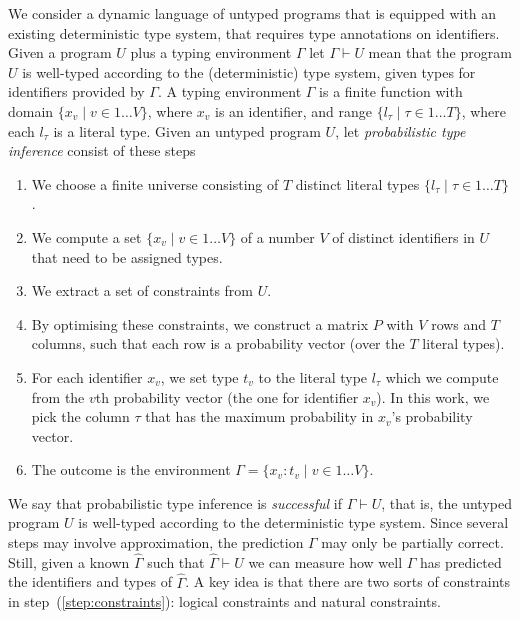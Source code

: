 \documentclass[acmsmall, review, anonymous]{acmart}\settopmatter{printfolios=true,printccs=false,printacmref=false}
\begin{document}
We consider a dynamic language of untyped programs that is equipped with an existing deterministic type system,
that requires type annotations on identifiers.
%
Given a program $U$ plus a typing environment $\Gamma$ let $\Gamma \vdash U$ mean that the program $U$ is well-typed according to the (deterministic) type system, given types for identifiers provided by $\Gamma$.
%
A typing environment $\Gamma$ is a finite function
with domain $\{ x_v \mid v \in 1 \ldots V\}$, where $x_v$  is an identifier, and range $\{ l_\tau \mid \tau \in 1 \dots T \}$, where each $l_\tau$ is a literal type.
Given an untyped program $U$,
let \emph{probabilistic type inference} consist of these steps
\begin{enumerate}
	\item We choose a finite universe consisting of $T$ distinct literal types $\{ l_\tau \mid \tau \in 1 \dots T \}$.
	\item We compute a set $\{ x_v \mid v \in 1 \ldots V\}$ of a number $V$ of distinct identifiers in $U$ that need to be assigned types.
	\item \label{step:constraints} We extract a set of constraints from $U$.
	\item \label{step:optimise} By optimising these constraints, we construct a matrix $P$ with $V$ rows and $T$ columns,
	      such that each row is a probability vector (over the $T$ literal types).
	\item For each identifier $x_v$, we set type $t_v$ to the literal type $l_\tau$ which we compute from the $v$th probability vector (the one for identifier $x_v$).  In this work, we pick the column $\tau$ that has the maximum probability in $x_v$'s probability vector.
	\item The outcome is the environment $\Gamma = \{ x_v : t_v \mid v \in 1 \ldots V\}$.
\end{enumerate}

We say that probabilistic type inference is \emph{successful} if $\Gamma \vdash U$, that is, the untyped program $U$ is well-typed according to the deterministic type system.
%
Since several steps may involve approximation, the prediction $\Gamma$ may only be partially correct.
%
Still, given a known $\hat{\Gamma}$ such that $\hat{\Gamma} \vdash U$ we can measure how well $\Gamma$ has predicted the identifiers and types of $\hat{\Gamma}$.
%
A key idea is that there are two sorts of constraints in step~(\ref{step:constraints}): logical constraints and natural
constraints.
\end{document}
